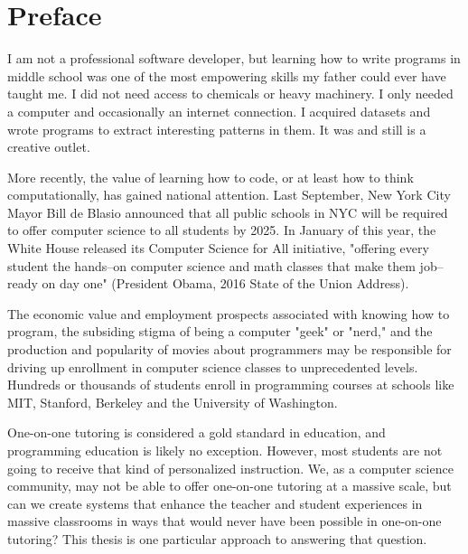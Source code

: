 % 

\cleardoublepage

\section*{Preface}
I am not a professional software developer, but learning how to write programs in middle school was one of the most empowering skills my father could ever have taught me. I did not need access to chemicals or heavy machinery. I only needed a computer and occasionally an internet connection. I acquired datasets and wrote programs to extract interesting patterns in them. It was and still is a creative outlet.

More recently, the value of learning how to code, or at least how to think computationally, has gained national attention. Last September, New York City Mayor Bill de Blasio announced that all public schools in NYC will be required to offer computer science to all students by 2025. In January of this year, the White House released its Computer Science for All initiative, "offering every student the hands--on computer science and math classes that make them job--ready on day one" (President Obama, 2016 State of the Union Address).

The economic value and employment prospects associated with knowing how to program, the subsiding stigma of being a computer "geek" or "nerd," and the production and popularity of movies about programmers may be responsible for driving up enrollment in computer science classes to unprecedented levels. Hundreds or thousands of students enroll in programming courses at schools like MIT, Stanford, Berkeley and the University of Washington.

One-on-one tutoring is considered a gold standard in education, and programming education is likely no exception. However, most students are not going to receive that kind of personalized instruction. We, as a computer science community, may not be able to offer one-on-one tutoring at a massive scale, but can we create systems that enhance the teacher and student experiences in massive classrooms in ways that would never have been possible in one-on-one tutoring? This thesis is one particular approach to answering that question. %


